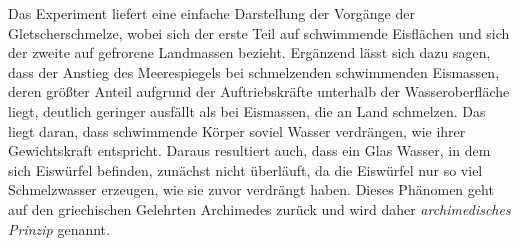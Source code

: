 Das Experiment liefert eine einfache Darstellung der Vorgänge der Gletscherschmelze, wobei sich der erste Teil auf schwimmende Eisflächen und sich der zweite auf gefrorene Landmassen bezieht.
Ergänzend lässt sich dazu sagen, dass der Anstieg des Meerespiegels bei schmelzenden schwimmenden Eismassen, deren größter Anteil aufgrund der Auftriebskräfte unterhalb der Wasseroberfläche liegt, deutlich geringer ausfällt als bei Eismassen, die an Land schmelzen.
Das liegt daran, dass schwimmende Körper soviel Wasser verdrängen, wie ihrer Gewichtskraft entspricht.
Daraus resultiert auch, dass ein Glas Wasser, in dem sich Eiswürfel befinden, zunächst nicht überläuft, da die Eiswürfel nur so viel Schmelzwasser erzeugen, wie sie zuvor verdrängt haben.
Dieses Phänomen geht auf den griechischen Gelehrten Archimedes zurück und wird daher \emph{archimedisches Prinzip} genannt.

